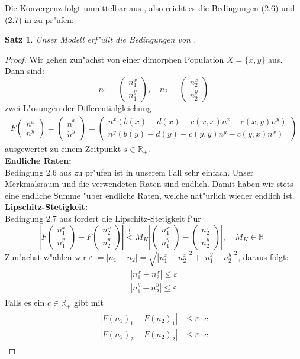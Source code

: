 \documentclass[11pt,a4paper]{article}
\theoremstyle{plain}
\newtheorem{satz}{Satz}
\newcommand{\eps}{\ensuremath{\varepsilon}}
\newcommand{\tvec}[2]{\begin{pmatrix}#1\\#2\end{pmatrix}}
\begin{document}
Die Konvergenz folgt unmittelbar aus \cite[\textbf{Thm 2.1}]{ethier2009markov}, also reicht es die Bedingungen (2.6) und (2.7) in \cite[\textbf{Thm 2.1}]{ethier2009markov} zu pr"ufen:

\begin{satz}
	Unser Modell erf"ullt die Bedingungen von \cite[\textbf{Theorem 2.1}]{ethier2009markov}.
\end{satz}

\begin{proof}
	Wir gehen zun"achst von einer dimorphen Population $ X = \{x,y\} $ aus. Dann sind:\\ 
	\[ n_1 = \tvec{n_1^x}{n_1^y}, \quad n_2 = \tvec{n_2^x}{n_2^y} \]
	zwei L"osungen der Differentialgleichung
	\begin{align}
		F\tvec{n^x}{n^y} = \tvec{\dot{n}^x}{\dot{n}^y} =  \tvec{n^x(b(x)-d(x)-c(x,x)n^x-c(x,y)n^y)}{n^y(b(y)-d(y)-c(y,y)n^y-c(y,x)n^x)}
		\label{nDGL}
	\end{align}
	ausgewertet zu einem Zeitpunkt $ s \in \mathbb{R}_{+} $.\\
	\textbf{Endliche Raten:}\\
	Bedingung 2.6 aus \cite[\textbf{Thm 2.1}]{ethier2009markov} zu pr"ufen ist in unserem Fall sehr einfach. Unser Merkmalsraum und die verwendeten Raten sind endlich. Damit haben wir stets eine endliche Summe "uber endliche Raten, welche nat"urlich wieder endlich ist.\\
	\textbf{Lipschitz-Stetigkeit:}\\
	Bedingung 2.7 aus \cite[\textbf{Thm 2.1}]{ethier2009markov} fordert die Lipschitz-Stetigkeit f"ur 
	\[ \left| F\tvec{n_1^x}{n_1^y} - F\tvec{n_2^x}{n_2^y} \right| \overset{!}{<} M_K \left| \tvec{n_1^x}{n_1^y} - \tvec{n_2^x}{n_2^y} \right|, \quad M_K \in \mathbb{R}_{+} \]
	Zun"achst w"ahlen wir $ \eps := |n_1 - n_2| = \sqrt{|n_1^x - n_2^x|^2 + |n_1^y - n_2^y|^2} $, daraus folgt:
	\begin{align}
	\begin{split}
		|n_1^x - n_2^x| \le \eps\\
		|n_1^y - n_2^y| \le \eps \label{epsAbsch}
	\end{split}
	\end{align}
	Falls es ein $ c \in \mathbb{R}_{+} $ gibt mit
	\begin{align}
	\begin{split}
		|F(n_1)_1 - F(n_2)_1| &\le \eps \cdot c\\
		|F(n_1)_2 - F(n_2)_2| &\le \eps \cdot c \label{BeweisLipschitz}
	\end{split}

\end{align}
\end{proof}
\end{document}
